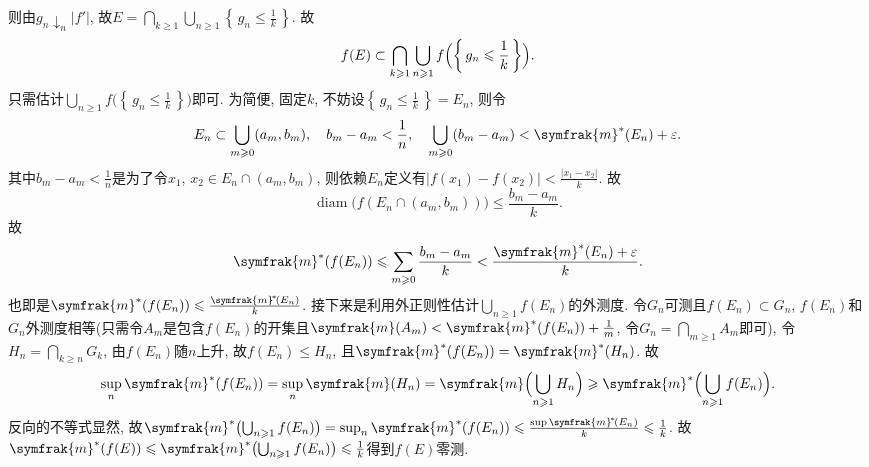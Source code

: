 \documentclass[options]{article}
\begin{document}
则由$g_n\downarrow_n |f'|$, 故$E=\bigcap_{k\geqslant 1}\bigcup_{n\geqslant 1}\left\{\,g_n\leqslant \frac{1}{k}\,\right\}$. 故
\[f(E)\subset \bigcap_{k\geqslant 1}\bigcup_{n\geqslant 1} f\Bigl(\left\{\,g_n\leqslant \frac{1}{k}\,\right\}\Bigr).\]
只需估计$\bigcup_{n\geqslant 1}f\bigl(\left\{\,g_n\leqslant \frac{1}{k}\,\right\}\bigr)$即可. 为简便, 固定$k$, 不妨设$\left\{\,g_n\leqslant \frac{1}{k}\,\right\}=E_n$, 则令
\[E_n\subset\bigcup_{m\geqslant 0}(a_m,b_m),\quad b_m-a_m<\frac{1}{n},\quad \bigcup_{m\geqslant 0}(b_m-a_m) < \symfrak{m}^*(E_n)+\varepsilon.\]
其中$b_m-a_m < \frac 1n$是为了令$x_1$, $x_2\in E_n\cap(a_m,b_m)$, 则依赖$E_n$定义有$|f(x_1)-f(x_2)|<\frac{|x_1-x_2|}{k}$. 故
\[\operatorname*{diam}\bigl(f(E_n\cap(a_m,b_m))\bigr)\leqslant \frac{b_m-a_m}{k}.\]
故
\[\symfrak{m}^*(f(E_n))\leqslant \sum_{m\geqslant 0} \frac{b_m-a_m}{k} < \frac{\symfrak{m}^*(E_n)+\varepsilon}{k}.\]
也即是$\symfrak{m}^*(f(E_n))\leqslant \frac{\symfrak{m}^{\!*\!}(E_n)}{k}$. 接下来是利用外正则性估计$\bigcup_{n\geqslant 1}f(E_n)$的外测度. 令$G_n$可测且$f(E_n)\subset G_n$, $f(E_n)$和$G_n$外测度相等(只需令$A_m$是包含$f(E_n)$的开集且$\symfrak{m}(A_m)<\symfrak{m}^*(f(E_n))+\frac{1}{m}$, 令$G_n=\bigcap_{m\geqslant 1}A_m$即可), 令$H_n=\bigcap_{k\geqslant n}G_k$, 由$f(E_n)$随$n$上升, 故$f(E_n)\leqslant H_n$, 且$\symfrak{m}^*(f(E_n))= \symfrak{m}^*(H_n)$. 故
\[\sup_n \symfrak{m}^*(f(E_n))=\sup_n \symfrak{m}(H_n)=\symfrak{m}\Bigl(\bigcup_{n\geqslant 1}H_n\Bigr)\geqslant \symfrak{m}^*\Bigl(\bigcup_{n\geqslant 1}f(E_n)\Bigr).\]
反向的不等式显然, 故$\symfrak{m}^*\bigl(\bigcup_{n\geqslant 1}f(E_n)\bigr)=\sup_n \symfrak{m}^*(f(E_n))\leqslant \frac{\sup \symfrak{m}^{\!*\!}(E_n)}{k}\leqslant \frac{1}{k}$. 故$\symfrak{m}^*(f(E))\leqslant \symfrak{m}^*\bigl(\bigcup_{n\geqslant 1}f(E_n)\bigr)\leqslant \frac{1}{k}$得到$f(E)$零测.

\hrulefill
\end{document}

